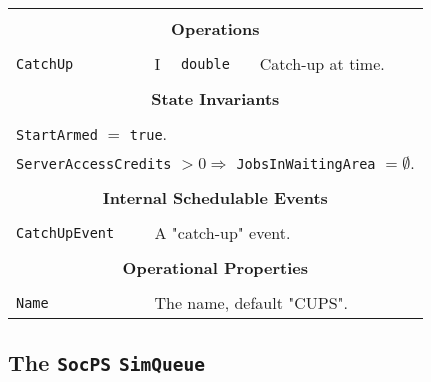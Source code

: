 \documentclass[12pt]{book}
\begin{document}
\begin{tabular}{|l|l|l|l|}
\hline
\multicolumn{4}{|c|}{} \\
\multicolumn{4}{|c|}{\bf Operations} \\
\multicolumn{4}{|c|}{} \\
\hline
\lstinline|CatchUp| & I & \lstinline|double| & Catch-up at time.\\
\hline
\multicolumn{4}{|c|}{} \\
\multicolumn{4}{|c|}{\bf State  Invariants} \\
\multicolumn{4}{|c|}{} \\
\hline
\multicolumn{4}{|l|}{\lstinline|StartArmed| $=$ \lstinline|true|.} \\
\multicolumn{4}{|l|}{\lstinline|ServerAccessCredits| $> 0 \Rightarrow$ \lstinline|JobsInWaitingArea| $= \emptyset$.} \\
\hline
\multicolumn{4}{|c|}{} \\
\multicolumn{4}{|c|}{\bf Internal Schedulable Events} \\
\multicolumn{4}{|c|}{} \\
\hline
\lstinline|CatchUpEvent| & \multicolumn{3}{|l|}{A "catch-up" event.} \\
\hline
\multicolumn{4}{|c|}{} \\
\multicolumn{4}{|c|}{\bf Operational Properties} \\
\multicolumn{4}{|c|}{} \\
\hline
\lstinline|Name| & \multicolumn{3}{|l|}{The name, default "CUPS".} \\
\hline
\end{tabular}

\subsection{The \lstinline{SocPS} \lstinline{SimQueue}}
\end{document}
